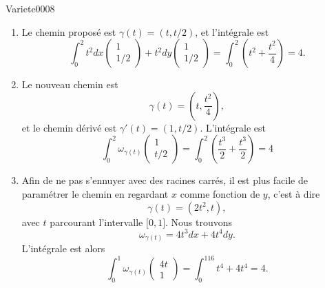 
\begin{corrige}{Variete0008}

	\begin{enumerate}

		\item
			Le chemin proposé est $\gamma(t)=(t,t/2)$, et l'intégrale est
			\begin{equation}
				\int_0^2t^2dx\begin{pmatrix}
					1	\\ 
					1/2	
				\end{pmatrix}+t^2dy\begin{pmatrix}
					1	\\ 
					1/2	
				\end{pmatrix}=
				\int_0^2\left( t^2+\frac{ t^2 }{ 4 } \right)=4.
			\end{equation}
		\item
			Le nouveau chemin est
			\begin{equation}
				\gamma(t)=(t,\frac{ t^2 }{ 4 }),
			\end{equation}
			et le chemin dérivé est $\gamma'(t)=(1,t/2)$. L'intégrale est
			\begin{equation}
				\int_0^2\omega_{\gamma(t)}\begin{pmatrix}
					1	\\ 
					t/2	
				\end{pmatrix}=
				\int_0^2(\frac{ t^3 }{ 2 }+\frac{ t^3 }{ 2 })=4
			\end{equation}
			
		\item
			Afin de ne pas s'ennuyer avec des racines carrés, il est plus facile de paramétrer le chemin en regardant $x$ comme fonction de $y$, c'est à dire
			\begin{equation}
				\gamma(t)=(2t^2,t),
			\end{equation}
			avec $t$ parcourant l'intervalle $\mathopen[ 0 , 1 \mathclose]$. Nous trouvons
			\begin{equation}
				\omega_{\gamma(t)}=4t^3dx+4t^4dy.
			\end{equation}
			L'intégrale est alors
			\begin{equation}
				\int_0^1\omega_{\gamma(t)}\begin{pmatrix}
					4t	\\ 
					1	
				\end{pmatrix}=
				\int_0^116t^4+4t^4=4.
			\end{equation}
		

\end{enumerate}
\end{corrige}
